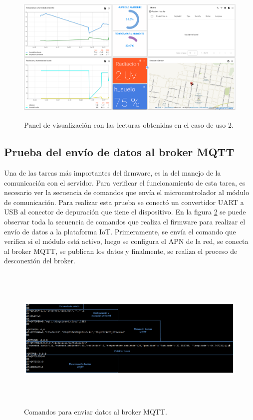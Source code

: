 \begin{figure}[h!]
  \centering
    \includegraphics[width=\linewidth, height=6.5cm]{./Figures/humedad_alta_tb.png}
  \caption{Panel de visualización con las lecturas obtenidas en el caso de uso 2.}
    \label{fig:Humedad alta ThingsBoard}
\end{figure}

\subsection{Prueba del envío de datos al broker MQTT}
Una de las tareas más importantes del firmware, es la del manejo de la comunicación con el servidor. Para verificar el funcionamiento de esta tarea, es necesario ver la secuencia de comandos que envía el microcontrolador al módulo de comunicación.
Para realizar esta prueba se conectó un convertidor UART a USB al conector de depuración que tiene el dispositivo.
En la figura \ref{fig:secuencia de comandos shell} se puede observar toda la secuencia de comandos que realiza el firmware para realizar el envío de datos a la plataforma IoT. Primeramente, se envía el comando que verifica si el módulo está activo, luego se configura el APN de la red, se conecta al broker MQTT, se publican los datos y finalmente, se realiza el proceso de desconexión del broker.

\begin{figure}[h]
  \centering
    \includegraphics[width=13cm, height=7cm]{./Figures/trama_envio_datos3.png}
  \caption{Comandos para enviar datos al broker MQTT.}
    \label{fig:secuencia de comandos shell}
\end{figure}

